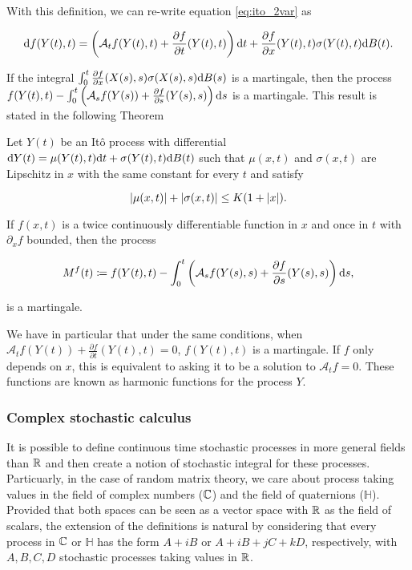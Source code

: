 With this definition, we can re-write equation \eqref{eq:ito_2var} as

\begin{equation*}
    \mathrm d f (Y(t),t) = \left( \mathcal A_t f(Y(t),t) + \frac{\partial f}{\partial t}(Y(t),t) \right) \mathrm d t + \frac{\partial f}{\partial x}(Y(t),t)\sigma(Y(t),t) \mathrm d B(t).
\end{equation*}

If the integral $\int_0^t \frac{\partial f}{\partial x}(X(s),s)\sigma(X(s),s) \mathrm d B(s)$ is a martingale, then the process $f(Y(t),t) - \int_0^t \left( \mathcal A_s f(Y(s)) + \frac{\partial f}{\partial s}(Y(s),s) \right) \mathrm d s$ is a martingale. This result is stated in the following Theorem

\begin{theorem}
    Let $Y(t)$ be an Itô process with differential $\mathrm d Y(t) = \mu(Y(t),t) \mathrm d t + \sigma(Y(t),t)\mathrm d B(t)$ such that $\mu(x,t)$ and $\sigma(x,t)$ are Lipschitz in $x$ with the same constant for every $t$ and satisfy

    \begin{equation*}
        \lvert \mu(x,t) \rvert + \lvert \sigma(x,t) \rvert \le K(1 + \lvert x \rvert).
    \end{equation*}

    If $f(x,t)$ is a twice continuously differentiable function in $x$ and once in $t$ with $\partial_x f$ bounded, then the process 

    \begin{equation*}
        M^f(t) \coloneqq f(Y(t),t) - \int_0^t \left( \mathcal A_s f(Y(s),s) + \frac{\partial f}{\partial s}(Y(s),s) \right) \mathrm d s,
    \end{equation*}

    \noindent is a martingale.
\end{theorem}

We have in particular that under the same conditions, when $\mathcal A_t f(Y(t)) + \frac{\partial f}{\partial t}(Y(t),t) = 0$, $f(Y(t),t)$ is a martingale. If $f$ only depends on $x$, this is equivalent to asking it to be a solution to $\mathcal A_t f = 0$. These functions are known as harmonic functions for the process $Y$.


\subsubsection{Complex stochastic calculus}


It is possible to define continuous time stochastic processes in more general fields than $\mathbb R$ and then create a notion of stochastic integral for these processes. Particuarly, in the case of random matrix theory, we care about process taking values in the field of complex numbers ($\mathbb C$) and the field of quaternions ($\mathbb H$). Provided that both spaces can be seen as a vector space with $\mathbb R$ as the field of scalars, the extension of the definitions is natural by considering that every process in $\mathbb C$ or $\mathbb H$ has the form $A + i B$ or $A + i B + j C + k D$, respectively, with $A,B,C,D$ stochastic processes taking values in $\mathbb R$.

